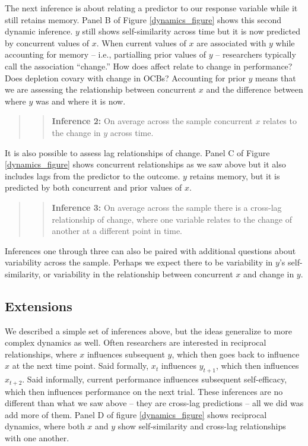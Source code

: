\documentclass[english,,man]{apa6}
\theoremstyle{definition}
\theoremstyle{definition}
\theoremstyle{definition}
\theoremstyle{remark}
\begin{document}
The next inference is about relating a predictor to our response
variable while it still retains memory. Panel B of Figure
\ref{dynamics_figure} shows this second dynamic inference. \(y\) still
shows self-similarity across time but it is now predicted by concurrent
values of \(x\). When current values of \(x\) are associated with \(y\)
while accounting for memory -- i.e., partialling prior values of \(y\)
-- researchers typically call the association \enquote{change.} How does
affect relate to change in performance? Does depletion covary with
change in OCBs? Accounting for prior \(y\) means that we are assessing
the relationship between concurrent \(x\) and the difference between
where \(y\) was and where it is now.

\begin{quote}
\begin{quote}
\textbf{Inference 2:} On average across the sample concurrent \(x\)
relates to the change in \(y\) across time.
\end{quote}
\end{quote}

It is also possible to assess lag relationships of change. Panel C of
Figure \ref{dynamics_figure} shows concurrent relationships as we saw
above but it also includes lags from the predictor to the outcome. \(y\)
retains memory, but it is predicted by both concurrent and prior values
of \(x\).

\begin{quote}
\begin{quote}
\textbf{Inference 3:} On average across the sample there is a cross-lag
relationship of change, where one variable relates to the change of
another at a different point in time.
\end{quote}
\end{quote}

Inferences one through three can also be paired with additional
questions about variability across the sample. Perhaps we expect there
to be variability in \(y\)'s self-similarity, or variability in the
relationship between concurrent \(x\) and change in \(y\).

\hypertarget{extensions}{%
\subsection{Extensions}\label{extensions}}

We described a simple set of inferences above, but the ideas generalize
to more complex dynamics as well. Often researchers are interested in
reciprocal relationships, where \(x\) influences subsequent \(y\), which
then goes back to influence \(x\) at the next time point. Said formally,
\(x_t\) influences \(y_{t+1}\), which then influences \(x_{t+2}\). Said
informally, current performance influences subsequent self-efficacy,
which then influences performance on the next trial. These inferences
are no different than what we saw above -- they are cross-lag
predictions -- all we did was add more of them. Panel D of figure
\ref{dynamics_figure} shows reciprocal dynamics, where both \(x\) and
\(y\) show self-similarity and cross-lag relationships with one another.
\end{document}
